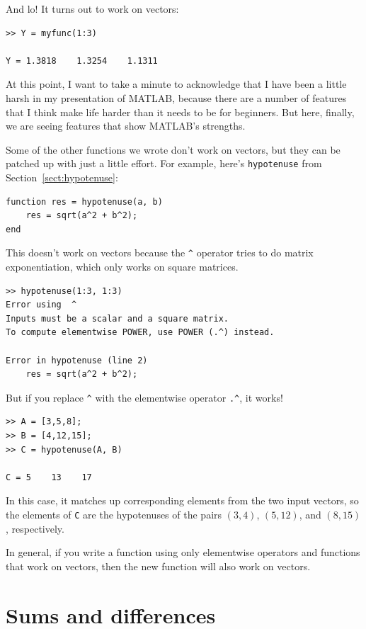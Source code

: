 \documentclass[
]{book}
\begin{document}
And lo!  It turns out to work on vectors:

\begin{verbatim}
>> Y = myfunc(1:3)

Y = 1.3818    1.3254    1.1311
\end{verbatim}

At this point, I want to take a minute to acknowledge that I
have been a little harsh in my presentation of MATLAB, because
there are a number of features that I think make life harder
than it needs to be for beginners.  But here, finally,
we are seeing features that show MATLAB's strengths.

Some of the other functions we wrote don't work on vectors,
but they can be patched up with just a little effort.  For example,
here's {\tt hypotenuse} from Section~\ref{sect:hypotenuse}:

\begin{verbatim}
function res = hypotenuse(a, b)
    res = sqrt(a^2 + b^2);
end
\end{verbatim}

This doesn't work on vectors because the \verb+^+ operator
tries to do matrix exponentiation, which only works on
square matrices.

\begin{verbatim}
>> hypotenuse(1:3, 1:3)
Error using  ^
Inputs must be a scalar and a square matrix.
To compute elementwise POWER, use POWER (.^) instead.

Error in hypotenuse (line 2)
    res = sqrt(a^2 + b^2);
\end{verbatim}

But if you replace \verb+^+ with the elementwise operator
\verb+.^+, it works!

\begin{verbatim}
>> A = [3,5,8];
>> B = [4,12,15];
>> C = hypotenuse(A, B)

C = 5    13    17
\end{verbatim}

In this case, it matches up corresponding elements from the two
input vectors, so the elements of {\tt C} are the hypotenuses of
the pairs $(3,4)$, $(5,12)$, and $(8,15)$, respectively.

In general, if you write a function using only elementwise
operators and functions that work on vectors, then the new
function will also work on vectors.


\section{Sums and differences}
\end{document}
